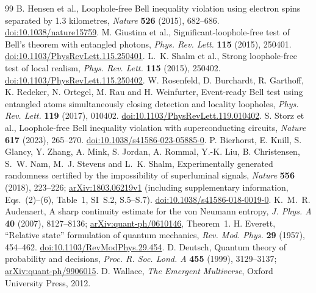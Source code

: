 \documentclass[11pt,a4paper]{article}
\theoremstyle{definition}
\theoremstyle{remark}\newtheorem{remark}[theorem]{Remark}
\begin{document}
\begin{thebibliography}{99}
 B. Hensen et al., Loophole-free Bell inequality violation using electron spins separated by 1.3 kilometres, \emph{Nature} \textbf{526} (2015), 682--686. \href{https://doi.org/10.1038/nature15759}{doi:10.1038/nature15759}.
 M. Giustina et al., Significant-loophole-free test of Bell's theorem with entangled photons, \emph{Phys. Rev. Lett.} \textbf{115} (2015), 250401. \href{https://doi.org/10.1103/PhysRevLett.115.250401}{doi:10.1103/PhysRevLett.115.250401}.
 L.~K. Shalm et al., Strong loophole-free test of local realism, \emph{Phys. Rev. Lett.} \textbf{115} (2015), 250402. \href{https://doi.org/10.1103/PhysRevLett.115.250402}{doi:10.1103/PhysRevLett.115.250402}.
 W. Rosenfeld, D. Burchardt, R. Garthoff, K. Redeker, N. Ortegel, M. Rau and H. Weinfurter, Event-ready Bell test using entangled atoms simultaneously closing detection and locality loopholes, \emph{Phys. Rev. Lett.} \textbf{119} (2017), 010402. \href{https://doi.org/10.1103/PhysRevLett.119.010402}{doi:10.1103/PhysRevLett.119.010402}.
 S. Storz et al., Loophole-free Bell inequality violation with superconducting circuits, \emph{Nature} \textbf{617} (2023), 265--270. \href{https://doi.org/10.1038/s41586-023-05885-0}{doi:10.1038/s41586-023-05885-0}.
 P. Bierhorst, E. Knill, S. Glancy, Y. Zhang, A. Mink, S. Jordan, A. Rommal, Y.-K. Liu, B. Christensen, S.~W. Nam, M.~J. Stevens and L.~K. Shalm, Experimentally generated randomness certified by the impossibility of superluminal signals, \emph{Nature} \textbf{556} (2018), 223--226; \href{https://arxiv.org/abs/1803.06219v1}{arXiv:1803.06219v1} (including supplementary information, Eqs.~(2)--(6), Table~1, SI~S.2, S.5--S.7). \href{https://doi.org/10.1038/s41586-018-0019-0}{doi:10.1038/s41586-018-0019-0}.
 K.~M.~R. Audenaert, A sharp continuity estimate for the von Neumann entropy, \emph{J. Phys. A} \textbf{40} (2007), 8127--8136; \href{https://arxiv.org/abs/quant-ph/0610146}{arXiv:quant-ph/0610146}, Theorem~1.
 H. Everett, ``Relative state'' formulation of quantum mechanics, \emph{Rev. Mod. Phys.} \textbf{29} (1957), 454--462. \href{https://doi.org/10.1103/RevModPhys.29.454}{doi:10.1103/RevModPhys.29.454}.
 D. Deutsch, Quantum theory of probability and decisions, \emph{Proc. R. Soc. Lond. A} \textbf{455} (1999), 3129--3137; \href{https://arxiv.org/abs/quant-ph/9906015}{arXiv:quant-ph/9906015}.
 D. Wallace, \emph{The Emergent Multiverse}, Oxford University Press, 2012.

\end{thebibliography}
\end{document}
